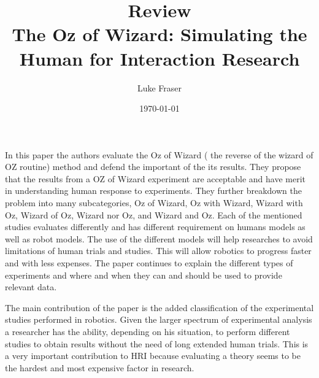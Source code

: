 \documentclass{article}
\begin{document}
\title{{\large Review} \\ The Oz of Wizard: Simulating the Human for Interaction Research}
\author{Luke Fraser}
\date{\today}
\maketitle

\begingroup
\renewcommand{\section}[2]{}


\endgroup

\section*{Summary}
In this paper the authors evaluate the Oz of Wizard ( the reverse of the wizard of OZ  routine) method and defend the important of the its results. They propose that the results from a OZ of Wizard experiment are acceptable and have merit in understanding human response to experiments. They further breakdown the problem into many subcategories, Oz of Wizard, Oz with Wizard, Wizard with Oz, Wizard of Oz, Wizard nor Oz, and Wizard and Oz. Each of the mentioned studies evaluates differently and has different requirement on humans models as well as robot models. The use of the different models will help researches to avoid limitations of human trials and studies. This will allow robotics to progress faster and with less expenses. The paper continues to explain the different types of experiments and where and when they can and should be used to provide relevant data.
\section*{Strengths}
The main contribution of the paper is the added classification of the experimental studies performed in robotics. Given the larger spectrum of experimental analysis a researcher has the ability, depending on his situation, to perform different studies to obtain results without the need of long extended human trials. This is a very important contribution to HRI because evaluating a theory seems to be the hardest and most expensive factor in research.
\end{document}
